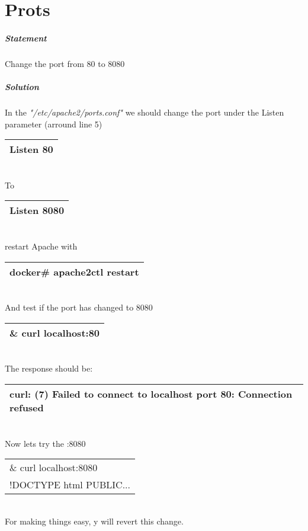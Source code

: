 \documentclass[a4paper,10pt]{article}
\begin{document}
\section{Prots}
\subparagraph{Statement}
Change the port from 80 to 8080
\subparagraph{Solution}
In the {\it"/etc/apache2/ports.conf"} we should change the port under the Listen parameter (arround line 5)
\vspace{0.5cm}\\\begin{tabular}{|l|}\hline
Listen 80
\\\hline\end{tabular}\vspace{0.5cm}\\
To
\vspace{0.5cm}\\\begin{tabular}{|l|}\hline
Listen 8080
\\\hline\end{tabular}\vspace{0.5cm}\\
restart Apache with
\vspace{0.5cm}\\\begin{tabular}{|l|}\hline
docker\# apache2ctl restart
\\\hline\end{tabular}\vspace{0.5cm}\\
And test if the port has changed to 8080
\vspace{0.5cm}\\\begin{tabular}{|l|}\hline
\& curl localhost:80
\\\hline\end{tabular}\vspace{0.5cm}\\
The response should be:
\vspace{0.5cm}\\\begin{tabular}{|l|}\hline
curl: (7) Failed to connect to localhost port 80: Connection refused
\\\hline\end{tabular}\vspace{0.5cm}\\
Now lets try the :8080
\vspace{0.5cm}\\\begin{tabular}{|l|}\hline
\& curl localhost:8080\\
!DOCTYPE html PUBLIC...
\\\hline\end{tabular}\vspace{0.5cm}\\
For making things easy, y will revert this change.
\pagebreak
\end{document}
